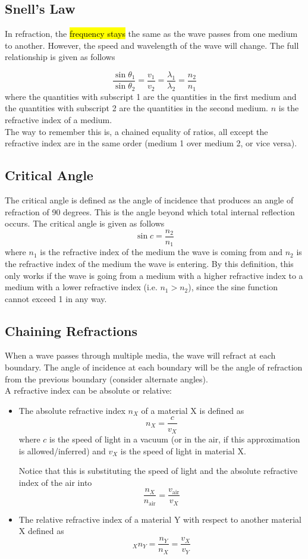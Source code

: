 \documentclass[a4paper,12pt]{article}
\newcommand{\lb}{\\[8pt]}
\begin{document}
\pagebreak

\subsection{Snell's Law}

In refraction, the \hl{frequency stays} the same as the wave passes from one medium to another. However, the speed and wavelength of the wave will change. The full relationship is given as follows

$$\frac{\sin \theta_1}{\sin \theta_2} = \frac{v_1}{v_2} = \frac{\lambda_1}{\lambda_2} = \frac{n_2}{n_1}$$
where the quantities with subscript 1 are the quantities in the first medium and the quantities with subscript 2 are the quantities in the second medium. $n$ is the refractive index of a medium.\lb
The way to remember this is, a chained equality of ratios, all except the refractive index are in the same order (medium 1 over medium 2, or vice versa).


\subsection{Critical Angle}

The critical angle is defined as the angle of incidence that produces an angle of refraction of 90 degrees. This is the angle beyond which total internal reflection occurs. The critical angle is given as follows
$$\sin c = \frac{n_2}{n_1}$$
where $n_1$ is the refractive index of the medium the wave is coming from and $n_2$ is the refractive index of the medium the wave is entering. By this definition, this only works if the wave is going from a medium with a higher refractive index to a medium with a lower refractive index (i.e. $n_1 > n_2$), since the sine function cannot exceed 1 in any way.


\subsection{Chaining Refractions}

When a wave passes through multiple media, the wave will refract at each boundary. The angle of incidence at each boundary will be the angle of refraction from the previous boundary (consider alternate angles).\lb
A refractive index can be absolute or relative:
\begin{itemize}
  \item The absolute refractive index $n_X$ of a material X is defined as
        $$n_X = \frac{c}{v_X}$$
        where $c$ is the speed of light in a vacuum (or in the air, if this approximation is allowed/inferred) and $v_X$ is the speed of light in material X.

        Notice that this is substituting the speed of light and the absolute refractive index of the air into $$\frac{n_X}{n_{\text{air}}} = \frac{v_{\text{air}}}{v_X}$$
  \item The relative refractive index of a material Y with respect to another material X defined as
        $$_Xn_Y = \frac{n_Y}{n_X}=\frac{v_X}{v_Y}$$
\end{itemize}
\end{document}

